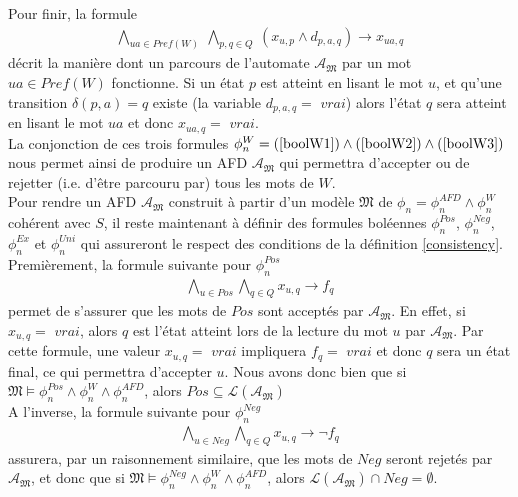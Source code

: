 \documentclass[12pt,a4paper,oneside,titlepage]{report}
\begin{document}
\noindent Pour finir, la formule
\begin{equation}
\label{boolW3}
\begin{aligned} \bigwedge _{ua \in Pref (W)}~ \bigwedge _{p,q \in Q}~ (x_{u, p} \wedge d_{p, a, q}) \rightarrow x_{ua, q} \end{aligned}
\end{equation}
décrit la manière dont un parcours de l'automate $\mathcal{A}_\mathfrak{M}$ par un mot $ua\in Pref(W)$ fonctionne. Si un état $p$ est atteint en lisant le mot $u$, et qu'une transition $\delta(p,a)=q$ existe (la variable $d_{p,a,q}=$ $vrai$) alors l'état $q$ sera atteint en lisant le mot $ua$ et donc $x_{ua,q}=$ $vrai$.\\

\noindent La conjonction de ces trois formules $\phi^W_n=(\ref{boolW1})\land(\ref{boolW2})\land(\ref{boolW3})$ nous permet ainsi de produire un AFD $\mathcal{A}_\mathfrak{M}$ qui permettra d'accepter ou de rejetter (i.e. d'être parcouru par) tous les mots de $W$.\\

\noindent Pour rendre un AFD $\mathcal{A}_\mathfrak{M}$ construit à partir d'un modèle $\mathfrak{M}$ de $\phi_n=\phi_n^{AFD}\land\phi^W_n$ cohérent avec $S$, il reste maintenant à définir des formules boléennes $\phi_n^{Pos}$, $\phi_n^{Neg}$, $\phi_n^{Ex}$ et $\phi_n^{Uni}$ qui assureront le respect des conditions de la définition \ref{consistency}.\\

\noindent Premièrement, la formule suivante pour $\phi_n^{Pos}$ 
\begin{equation}
\label{boolPos}
\begin{aligned} \bigwedge_{u\in Pos} \bigwedge_{q\in Q} x_{u,q} \rightarrow f_q \end{aligned}
\end{equation} 
permet de s'assurer que les mots de $Pos$ sont acceptés par $\mathcal{A}_\mathfrak{M}$. En effet, si $x_{u,q}=$ $vrai$, alors $q$ est l'état atteint lors de la lecture du mot $u$ par $\mathcal{A}_\mathfrak{M}$. Par cette formule, une valeur $x_{u,q}=$ $vrai$ impliquera $f_q=$ $vrai$ et donc $q$ sera un état final, ce qui permettra d'accepter $u$. Nous avons donc bien que si $\mathfrak{M}\models \phi_n^{Pos}\land\phi_n^W\land\phi_n^{AFD}$, alors $Pos\subseteq \mathcal{L}(\mathcal{A}_\mathfrak{M})$\\

\noindent A l'inverse, la formule suivante pour $\phi_n^{Neg}$ 
\begin{equation}
\label{boolNeg}
\begin{aligned} \bigwedge_{u\in Neg} \bigwedge_{q\in Q} x_{u,q} \rightarrow \neg f_q \end{aligned}
\end{equation} 
assurera, par un raisonnement similaire, que les mots de $Neg$ seront rejetés par $\mathcal{A}_\mathfrak{M}$, et donc que si $\mathfrak{M}\models \phi_n^{Neg}\land\phi_n^W\land\phi_n^{AFD}$, alors $\mathcal{L}(\mathcal{A}_\mathfrak{M})\cap Neg=\emptyset$.\\
\end{document}
